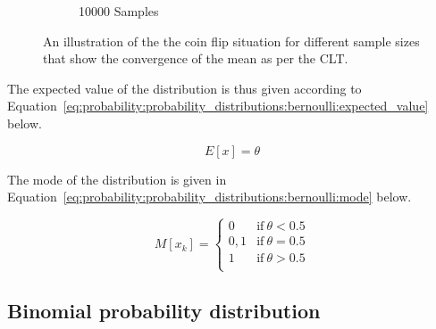 \begin{figure}[htbp]
\begin{subfigure}{0.49\textwidth}
            \caption{10000 Samples}
            \label{fig:probability:probability_distributions:bernoulli:coin_10000}
      \end{subfigure}
      \par\bigskip
      \caption{An illustration of the the coin flip situation for different sample sizes that show the convergence of the mean as per the \acf{CLT}.}
      \label{fig:probability:probability_distributions:bernoulli:coin}
\end{figure}

\noindent
The expected value of the distribution is thus given according to Equation~\eqref{eq:probability:probability_distributions:bernoulli:expected_value} below.

\begin{equation}
      \label{eq:probability:probability_distributions:bernoulli:expected_value}
      E[x] = \theta
\end{equation}

\noindent
The mode of the distribution is given in Equation~\eqref{eq:probability:probability_distributions:bernoulli:mode} below.

\begin{equation}
      \label{eq:probability:probability_distributions:bernoulli:mode}
      M[x_{k}] =
      \begin{cases}
            0   & \text{if}\ \theta < 0.5 \\
            0,1 & \text{if}\ \theta = 0.5 \\
            1   & \text{if}\ \theta > 0.5 \\
      \end{cases}
\end{equation}


\subsection{Binomial probability distribution}\label{sec:probability:probability_distributions:bin}


